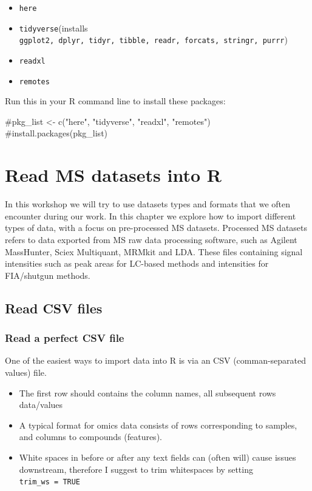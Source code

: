 \documentclass[
  letterpaper,
  DIV=11,
  numbers=noendperiod]{scrreprt}
\newenvironment{Shaded}{\begin{snugshade}}{\end{snugshade}}
\newcommand{\CommentTok}[1]{\textcolor[rgb]{0.37,0.37,0.37}{#1}}
\providecommand{\tightlist}{%
  \setlength{\itemsep}{0pt}\setlength{\parskip}{0pt}}\usepackage{longtable,booktabs,array}
\begin{document}
\begin{itemize}
\tightlist
\item
  \texttt{here}
\item
  \texttt{tidyverse}(installs
  \texttt{ggplot2,\ dplyr,\ tidyr,\ tibble,\ readr,\ forcats,\ stringr,\ purrr})
\item
  \texttt{readxl}
\item
  \texttt{remotes}
\end{itemize}

Run this in your R command line to install these packages:

\begin{Shaded}
\begin{Highlighting}[]
\CommentTok{\#pkg\_list \textless{}{-} c("here", "tidyverse", "readxl", "remotes")}
\CommentTok{\#install.packages(pkg\_list)}
\end{Highlighting}
\end{Shaded}

\hypertarget{read-ms-datasets-into-r}{%
\chapter{Read MS datasets into R}\label{read-ms-datasets-into-r}}

In this workshop we will try to use datasets types and formats that we
often encounter during our work. In this chapter we explore how to
import different types of data, with a focus on pre-processed MS
datasets. Processed MS datasets refers to data exported from MS raw data
processing software, such as Agilent MassHunter, Sciex Multiquant,
MRMkit and LDA. These files containing signal intensities such as peak
areas for LC-based methods and intensities for FIA/shutgun methods.

\hypertarget{read-csv-files}{%
\section{Read CSV files}\label{read-csv-files}}

\hypertarget{read-a-perfect-csv-file}{%
\subsection{Read a perfect CSV file}\label{read-a-perfect-csv-file}}

One of the easiest ways to import data into R is via an CSV
(comman-separated values) file.

\begin{itemize}
\tightlist
\item
  The first row should contains the column names, all subsequent rows
  data/values
\item
  A typical format for omics data consists of rows corresponding to
  samples, and columns to compounds (features).
\item
  White spaces in before or after any text fields can (often will) cause
  issues downstream, therefore I suggest to trim whitespaces by setting
  \texttt{trim\_ws\ =\ TRUE}
\end{itemize}
\end{document}
